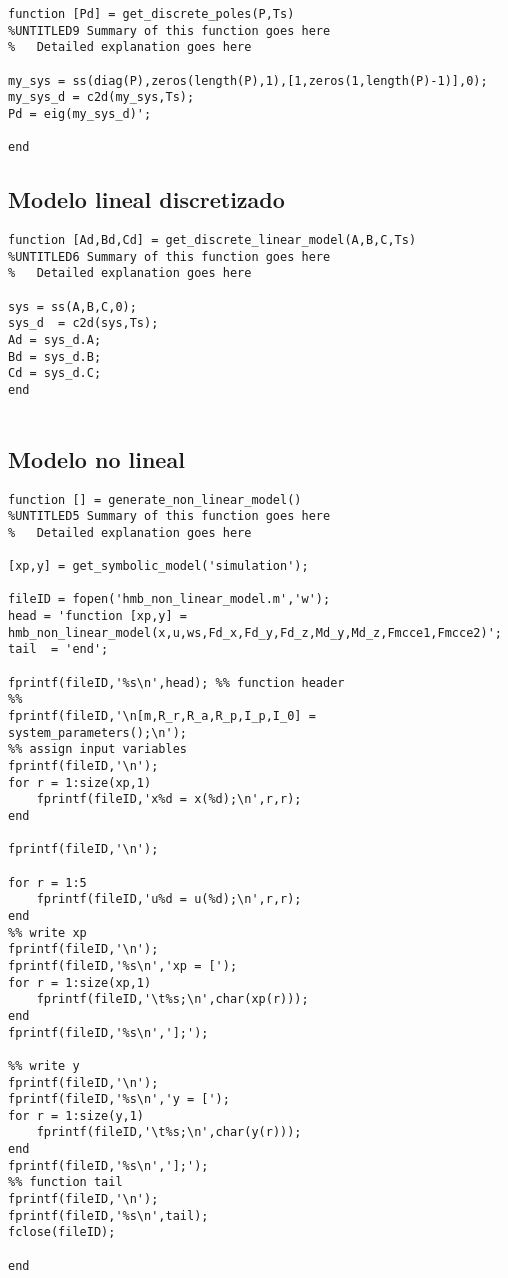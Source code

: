 \begin{lstlisting}[frame=single]
function [Pd] = get_discrete_poles(P,Ts)
%UNTITLED9 Summary of this function goes here
%   Detailed explanation goes here

my_sys = ss(diag(P),zeros(length(P),1),[1,zeros(1,length(P)-1)],0);
my_sys_d = c2d(my_sys,Ts);
Pd = eig(my_sys_d)';

end

\end{lstlisting}
 
\subsection{Modelo lineal discretizado}

\begin{lstlisting}[frame=single]
function [Ad,Bd,Cd] = get_discrete_linear_model(A,B,C,Ts)
%UNTITLED6 Summary of this function goes here
%   Detailed explanation goes here

sys = ss(A,B,C,0); 
sys_d  = c2d(sys,Ts);
Ad = sys_d.A;
Bd = sys_d.B;
Cd = sys_d.C;
end


\end{lstlisting}
 
\subsection{Modelo no lineal}

\begin{lstlisting}[frame=single]
function [] = generate_non_linear_model()
%UNTITLED5 Summary of this function goes here
%   Detailed explanation goes here

[xp,y] = get_symbolic_model('simulation');

fileID = fopen('hmb_non_linear_model.m','w');
head = 'function [xp,y] =
hmb_non_linear_model(x,u,ws,Fd_x,Fd_y,Fd_z,Md_y,Md_z,Fmcce1,Fmcce2)';
tail  = 'end';

fprintf(fileID,'%s\n',head); %% function header
%%
fprintf(fileID,'\n[m,R_r,R_a,R_p,I_p,I_0] = 
system_parameters();\n');
%% assign input variables
fprintf(fileID,'\n');
for r = 1:size(xp,1)
    fprintf(fileID,'x%d = x(%d);\n',r,r);
end

fprintf(fileID,'\n');

for r = 1:5
    fprintf(fileID,'u%d = u(%d);\n',r,r);
end
%% write xp
fprintf(fileID,'\n');
fprintf(fileID,'%s\n','xp = [');
for r = 1:size(xp,1)
    fprintf(fileID,'\t%s;\n',char(xp(r)));    
end
fprintf(fileID,'%s\n','];');

%% write y
fprintf(fileID,'\n');
fprintf(fileID,'%s\n','y = [');
for r = 1:size(y,1)
    fprintf(fileID,'\t%s;\n',char(y(r)));
end
fprintf(fileID,'%s\n','];');
%% function tail
fprintf(fileID,'\n');
fprintf(fileID,'%s\n',tail);
fclose(fileID);

end


\end{lstlisting}


